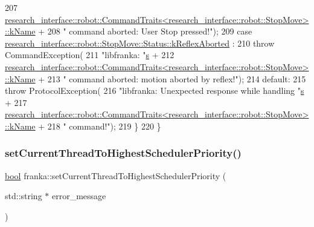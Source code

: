 \begin{DoxyCode}
207           
      \hyperlink{structresearch__interface_1_1robot_1_1CommandTraits}{research\_interface::robot::CommandTraits<research\_interface::robot::StopMove>::kName}
       +
208           \textcolor{stringliteral}{" command aborted: User Stop pressed!"});
209     \textcolor{keywordflow}{case} \hyperlink{structresearch__interface_1_1robot_1_1StopMove_a74b1999fa778670f312087dd9acf231daedb741f9f460686f7d799eb503d047f1}{research\_interface::robot::StopMove::Status::kReflexAborted}
      :
210       \textcolor{keywordflow}{throw} CommandException(
211           \textcolor{stringliteral}{"libfranka: "}\hyperlink{namespaceservice__node__3_aa976421a49e0b54f23833423400849ae}{s} +
212           
      \hyperlink{structresearch__interface_1_1robot_1_1CommandTraits}{research\_interface::robot::CommandTraits<research\_interface::robot::StopMove>::kName}
       +
213           \textcolor{stringliteral}{" command aborted: motion aborted by reflex!"});
214     \textcolor{keywordflow}{default}:
215       \textcolor{keywordflow}{throw} ProtocolException(
216           \textcolor{stringliteral}{"libfranka: Unexpected response while handling "}\hyperlink{namespaceservice__node__3_aa976421a49e0b54f23833423400849ae}{s} +
217           
      \hyperlink{structresearch__interface_1_1robot_1_1CommandTraits}{research\_interface::robot::CommandTraits<research\_interface::robot::StopMove>::kName}
       +
218           \textcolor{stringliteral}{" command!"});
219   \}
220 \}
\end{DoxyCode}
\mbox{\label{namespacefranka_a5c090196bc50ead82194d3e594e61e65}} 
\subsubsection{\texorpdfstring{set\+Current\+Thread\+To\+Highest\+Scheduler\+Priority()}{setCurrentThreadToHighestSchedulerPriority()}}
{\footnotesize\ttfamily \hyperlink{classbool}{bool} franka\+::set\+Current\+Thread\+To\+Highest\+Scheduler\+Priority (\begin{DoxyParamCaption}\item[{std\+::string $\ast$}]{error\+\_\+message }\end{DoxyParamCaption})}

